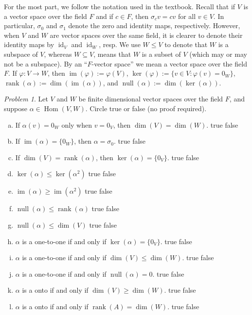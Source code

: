 \documentclass[11pt]{paper}
\theoremstyle{remark}
\newtheorem{problem}{Problem}
\newcommand{\<}{\ensuremath{\langle}}
\renewcommand{\>}{\ensuremath{\rangle}}
\newcommand\Hom{\ensuremath{\operatorname{Hom}}}
\newcommand{\id}{\ensuremath{\operatorname{id}}}
\newcommand{\nulity}[1]{\ensuremath{\operatorname{null}(#1)}}
\renewcommand{\ker}[1]{\ensuremath{\operatorname{ker}(#1)}}
\renewcommand{\dim}[1]{\ensuremath{\operatorname{dim}(#1)}}
\newcommand\im[1]{\ensuremath{\operatorname{im}(#1)}}
\newcommand{\rank}[1]{\ensuremath{\operatorname{rank}(#1)}}
\renewcommand{\phi}{\ensuremath{\varphi}}
\renewcommand{\leq}{\ensuremath{\leqslant}}
\renewcommand{\geq}{\ensuremath{\geqslant}}
\begin{document}
\medskip

For the most part, we follow the notation used in the textbook.
Recall that if $V$ is a vector space over the field $F$ and if
$c\in F$, then $\sigma_c v = cv$ for all $v \in V$.
In particular, $\sigma_0$ and $\sigma_1$ denote the zero and identity maps,
respectively. However, when $V$ and $W$ are vector spaces over the same field,
it is clearer to denote their identity maps by $\id_V$ and $\id_W$, resp.
We use $W\leq V$ to denote that $W$ is a subspace of $V$, 
whereas $W\subseteq V$, means that $W$ is a subset of $V$ 
(which may or may not be a subspace).  By an ``$F$-vector space'' we mean a
vector space over the field $F$. If $\phi : V \rightarrow W$, then
$\im{\phi} := \phi(V)$, $\ker{\phi} := \{v \in V : \phi(v) = 0_W\}$,
$\rank{\alpha} := \dim{\im{\alpha}}$, and $\nulity{\alpha} := \dim{\ker{\alpha}}$.
\probskip

\begin{problem}
Let $V$ and $W$ be finite dimensional vector spaces over the field $F$, and
suppose $\alpha \in \Hom(V,W)$.
Circle true or false (no proof required).
\begin{enumerate}[(a)]
\item If $\alpha(v) = 0_W$ only when $v=0_V$, then $\dim{V} = \dim{W}$.
 \hfill true \hskip1cm false
\item If $\im{\alpha} = \{0_W\}$, then $\alpha = \sigma_0$.
 \hfill true \hskip1cm false
\item If $\dim{V} = \rank{\alpha}$, then $\ker{\alpha} = \{0_V\}$.
 \hfill true \hskip1cm false
\item $\ker{\alpha}\leq \ker{\alpha^2}$
 \hfill true \hskip1cm false
\item $\im{\alpha}\geq \im{\alpha^2}$
 \hfill true \hskip1cm false
\item $\nulity{\alpha} \leq \rank{\alpha}$
 \hfill true \hskip1cm false
\item $\nulity{\alpha} \leq \dim{V}$
 \hfill true \hskip1cm false
\item $\alpha$ is a one-to-one if and only if $\ker{\alpha} = \{0_V\}$.
 \hfill true \hskip1cm false
\item $\alpha$ is a one-to-one if and only if $\dim{V} \leq \dim{W}$.
 \hfill true \hskip1cm false
\item $\alpha$ is a one-to-one if and only if $\nulity{\alpha} = 0$.
 \hfill true \hskip1cm false
\item $\alpha$ is a onto if and only if $\dim{V} \geq \dim{W}$.
 \hfill true \hskip1cm false
\item $\alpha$ is a onto if and only if $\rank{A} =\dim{W}$.
 \hfill true \hskip1cm false
\end{enumerate}
\end{problem}
\end{document}
